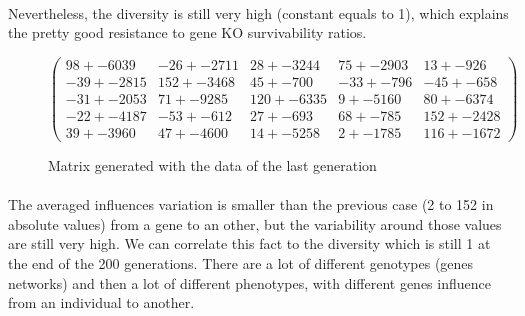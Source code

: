 \documentclass[]{report} %
\begin{document}
    \paragraph*{}
    Nevertheless, the diversity is still very high (constant equals to 1), which explains the pretty good resistance to gene KO survivability ratios.
   

    \begin{figure}[H] 
            \centering
            \small
    $
            \begin{pmatrix}
                98 +- 6039 & -26 +- 2711 & 28 +- 3244 & 75 +- 2903 & 13 +- 926 \\
                -39 +- 2815 & 152 +- 3468 & 45 +- 700 & -33 +- 796 & -45 +- 658 \\
                -31 +- 2053 & 71 +- 9285 & 120 +- 6335 & 9 +- 5160 & 80 +- 6374 \\
                -22 +- 4187 & -53 +- 612 & 27 +- 693 & 68 +- 785 & 152 +- 2428 \\
                39 +- 3960 & 47 +- 4600 & 14 +- 5258 & 2 +- 1785 & 116 +- 1672 
            \end{pmatrix}
    $
            \caption{\footnotesize Matrix generated with the data of the last generation}
            \label{mat:ps300xg200xmr1-10-1}
    \end{figure}
    \paragraph*{}
    The averaged influences variation is smaller than the previous case (2 to 152 in absolute values) from a gene to an other, but the variability around those values are still very high. 
    We can correlate this fact to the diversity which is still 1 at the end of the 200 generations. 
    There are a lot of different genotypes (genes networks) and then a lot of different phenotypes, with different genes influence from an individual to another.
    
    
    \newpage
\end{document}
